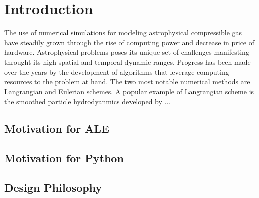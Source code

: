 \section{Introduction}
\label{sec.introduction}

The use of numerical simulations for modeling astrophysical compressible 
gas have steadily grown through the rise of computing power and decrease
in price of hardware. Astrophysical problems poses its unique set of challenges
manifesting throught its high spatial and temporal dynamic ranges. Progress
has been made over the years by the development of algorithms that leverage
computing resources to the problem at hand. The two most notable numerical methods 
are Langrangian and Eulerian schemes. A popular example of Langrangian scheme
is the smoothed particle hydrodyanmics developed by ... 

\subsection{Motivation for ALE}
\label{sec.motivation_ale}

\subsection{Motivation for Python}
\label{sec.motivation_python}

\subsection{Design Philosophy}
\label{sec.design_philosophy}
